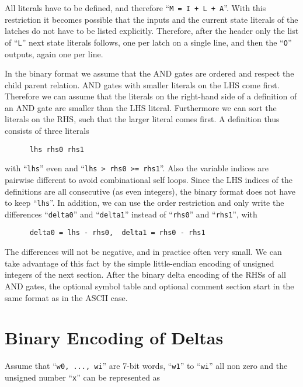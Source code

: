 \documentclass[10pt]{llncs}
\begin{document}
  All literals have to be defined, and therefore ``\texttt{M = I + L + A}''.  With this
  restriction it becomes possible that the inputs and the current state
  literals of the latches do not have to be listed explicitly.  Therefore,
  after the header only the list of ``\texttt{L}'' next state literals follows, one per
  latch on a single line, and then the ``\texttt{O}'' outputs, again one per line.

  In the binary format we assume that the AND gates are ordered and respect
  the child parent relation.  AND gates with smaller literals on the LHS
  come first.  Therefore we can assume that the literals on the right-hand
  side of a definition of an AND gate are smaller than the LHS literal.
  Furthermore we can sort the literals on the RHS, such that the larger
  literal comes first.  A definition thus consists of three literals
    
\begin{verbatim}
      lhs rhs0 rhs1
\end{verbatim}

  with ``\texttt{lhs}'' even and ``\texttt{lhs > rhs0 >= rhs1}''.  Also the variable indices are
  pairwise different to avoid combinational self loops.  Since the LHS
  indices of the definitions are all consecutive (as even integers),
  the binary format does not have to keep ``\texttt{lhs}''.  In addition, we can use
  the order restriction and only write the differences ``\texttt{delta0}'' and
  ``\texttt{delta1}''
  instead of ``\texttt{rhs0}'' and ``\texttt{rhs1}'', with

\begin{verbatim}
      delta0 = lhs - rhs0,  delta1 = rhs0 - rhs1
\end{verbatim}
  
  The differences will not be negative, and in practice often very small.
  We can take advantage of this fact by the simple little-endian encoding of
  unsigned integers of the next section.  After the binary delta encoding of
  the RHSs of all AND gates, the optional symbol table and optional comment
  section start in the same format as in the ASCII case.

\section{Binary Encoding of Deltas}
  
  Assume that ``\texttt{w0, ..., wi}'' are 7-bit words, ``\texttt{w1}'' to
  ``\texttt{wi}'' all non zero and
  the unsigned number ``\texttt{x}'' can be represented as
    
\end{document}
